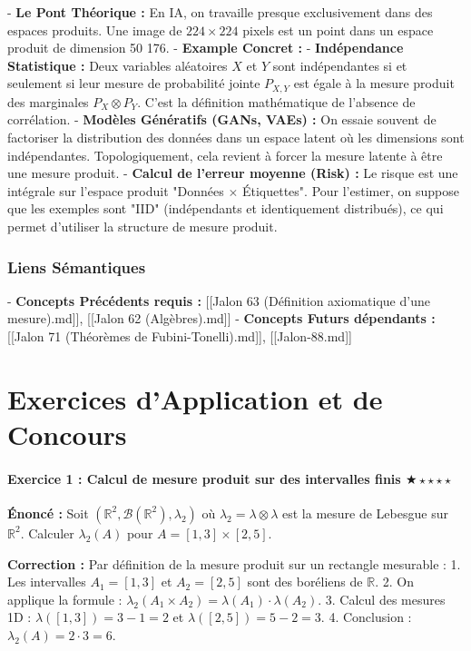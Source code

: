 \documentclass[11pt,a4paper]{article}
\begin{document}
- \textbf{Le Pont Théorique :} En IA, on travaille presque exclusivement dans des espaces produits. Une image de $224 \times 224$ pixels est un point dans un espace produit de dimension 50 176.
- \textbf{Example Concret :}
    - \textbf{Indépendance Statistique :} Deux variables aléatoires $X$ et $Y$ sont indépendantes si et seulement si leur mesure de probabilité jointe $P_{X,Y}$ est égale à la mesure produit des marginales $P_X \otimes P_Y$. C'est la définition mathématique de l'absence de corrélation.
    - \textbf{Modèles Génératifs (GANs, VAEs) :} On essaie souvent de factoriser la distribution des données dans un espace latent où les dimensions sont indépendantes. Topologiquement, cela revient à forcer la mesure latente à être une mesure produit.
    - \textbf{Calcul de l'erreur moyenne (Risk) :} Le risque est une intégrale sur l'espace produit "Données $\times$ Étiquettes". Pour l'estimer, on suppose que les exemples sont "IID" (indépendants et identiquement distribués), ce qui permet d'utiliser la structure de mesure produit.

\section{Liens Sémantiques}

- \textbf{Concepts Précédents requis :} [[Jalon 63 (Définition axiomatique d'une mesure).md]], [[Jalon 62 (Algèbres).md]]
- \textbf{Concepts Futurs dépendants :} [[Jalon 71 (Théorèmes de Fubini-Tonelli).md]], [[Jalon-88.md]]
\part{Exercices d'Application et de Concours}
\subsection*{Exercice 1 : Calcul de mesure produit sur des intervalles finis \quad $\bigstar\star\star\star\star$}

\textbf{Énoncé :}
Soit $(\mathbb{R}^2, \mathcal{B}(\mathbb{R}^2), \lambda_2)$ où $\lambda_2 = \lambda \otimes \lambda$ est la mesure de Lebesgue sur $\mathbb{R}^2$.
Calculer $\lambda_2(A)$ pour $A = [1, 3] \times [2, 5]$.

\textbf{Correction :}
Par définition de la mesure produit sur un rectangle mesurable :
1. Les intervalles $A_1 = [1, 3]$ et $A_2 = [2, 5]$ sont des boréliens de $\mathbb{R}$.
2. On applique la formule : $\lambda_2(A_1 \times A_2) = \lambda(A_1) \cdot \lambda(A_2)$.
3. Calcul des mesures 1D : $\lambda([1, 3]) = 3 - 1 = 2$ et $\lambda([2, 5]) = 5 - 2 = 3$.
4. Conclusion : $\lambda_2(A) = 2 \cdot 3 = 6$.
\end{document}
